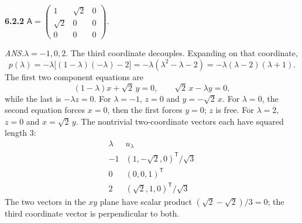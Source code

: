 \par\bigskip
\noindent\textbf{6.2.2}\quad
$\mathsf{A}=\begin{pmatrix}1&\sqrt{2}&0\\\sqrt{2}&0&0\\
0&0&0\end{pmatrix}$.
\par\nobreak\hfill\emph{ANS.}\enspace $\lambda=-1,0,2$.
\solution
The third coordinate decouples. Expanding on that coordinate,
\[
p(\lambda)=-\lambda\bigl[(1-\lambda)(-\lambda)-2\bigr]
=-\lambda(\lambda^2-\lambda-2)
=-\lambda(\lambda-2)(\lambda+1).
\]
The first two component equations are
\[
(1-\lambda)x+\sqrt2\,y=0,\qquad
\sqrt2\,x-\lambda y=0,
\]
while the last is $-\lambda z=0$.
For $\lambda=-1$, $z=0$ and $y=-\sqrt2\,x$.
For $\lambda=0$, the second equation forces $x=0$, then the first
forces $y=0$; $z$ is free.
For $\lambda=2$, $z=0$ and $x=\sqrt2\,y$.
The nontrivial two-coordinate vectors each have squared length $3$:
\[
\boxed{\begin{array}{c|c}
\lambda&u_\lambda\\\hline
-1&(1,-\sqrt2,0)^{\mathsf T}/\sqrt3\\
0&(0,0,1)^{\mathsf T}\\
2&(\sqrt2,1,0)^{\mathsf T}/\sqrt3
\end{array}}
\]
The two vectors in the $xy$ plane have scalar product
$(\sqrt2-\sqrt2)/3=0$; the third coordinate vector is perpendicular
to both.


